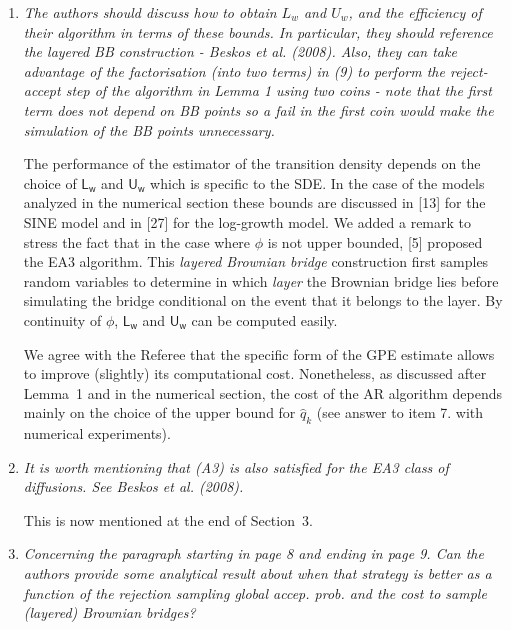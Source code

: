 \documentclass[12pt]{article}
\newcommand{\1}{\mathrm{1}}
\newcommand{\mw}{\mathsf{w}}%
\newcommand{\U}{\mathsf{U}}
\newcommand{\Lo}{\mathsf{L}}
\begin{document}
\begin{enumerate}
\item {\em The authors should discuss how to obtain $L_w$ and $U_w$, and the efficiency of their
algorithm in terms of these bounds. In particular, they should reference the layered
BB construction - Beskos et al. (2008). Also, they can take advantage of the factorisation (into two terms) in (9) to perform the reject-accept step of the algorithm
in Lemma 1 using two coins - note that the first term does not depend on BB points
so a fail in the first coin would make the simulation of the BB points unnecessary.}

\vspace{.3cm}

The performance of the estimator of the transition density depends on the choice of $\Lo_\mw$ and $\U_\mw$ which is specific to the SDE. In the case of the models analyzed in the numerical section these bounds are discussed in [13] for the SINE model and in [27] for the log-growth model. We added a remark to stress the fact that  in the case where $\phi$ is not upper bounded, [5] proposed the EA3 algorithm. This {\em layered Brownian bridge} construction first samples random variables to determine in which {\em layer} the Brownian bridge lies before simulating the bridge conditional on the event that it belongs to the layer. By continuity of $\phi$, $\Lo_\mw$ and  $\U_\mw$ can be computed easily. 

We agree with the Referee that the specific form of the GPE estimate allows to improve (slightly) its computational cost. Nonetheless, as discussed after Lemma~1 and in the numerical section, the cost of the AR algorithm depends mainly on the choice of the upper bound for $\widehat{q}_k$ (see answer to item 7. with numerical experiments).

\item {\em It is worth mentioning that (A3) is also satisfied for the EA3 class of diffusions. See
Beskos et al. (2008).}

\vspace{.3cm}

This is now mentioned at the end of Section~3.

\item {\em Concerning the paragraph starting in page 8 and ending in page 9. Can the authors
provide some analytical result about when that strategy is better as a function of the
rejection sampling global accep. prob. and the cost to sample (layered) Brownian
bridges?}

\vspace{.3cm}


\end{enumerate}
\end{document}
